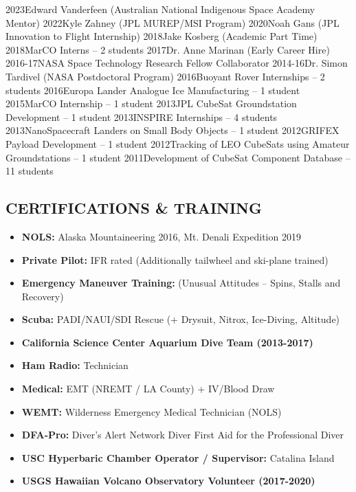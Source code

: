 \documentclass[11pt,letterpaper]{article}
\begin{document}
2023Edward Vanderfeen (Australian National Indigenous Space Academy Mentor)
2022Kyle Zahney (JPL MUREP/MSI Program)
2020Noah Gans (JPL Innovation to Flight Internship)
2018Jake Kosberg (Academic Part Time)
2018MarCO Interns – 2 students
2017Dr. Anne Marinan (Early Career Hire)
2016-17NASA Space Technology Research Fellow Collaborator
2014-16Dr. Simon Tardivel (NASA Postdoctoral Program)
2016Buoyant Rover Internships – 2 students
2016Europa Lander Analogue Ice Manufacturing – 1 student
2015MarCO Internship – 1 student
2013JPL CubeSat Groundstation Development – 1 student
2013INSPIRE Internships – 4 students
2013NanoSpacecraft Landers on Small Body Objects – 1 student
2012GRIFEX Payload Development – 1 student
2012Tracking of LEO CubeSats using Amateur Groundstations – 1 student
2011Development of CubeSat Component Database – 11 students


\subsection*{CERTIFICATIONS \& TRAINING}
\begin{itemize}
\item \textbf{NOLS:} Alaska Mountaineering 2016, Mt. Denali Expedition 2019
\item \textbf{Private Pilot:} IFR rated (Additionally tailwheel and ski-plane trained)
\item \textbf{Emergency Maneuver Training:} (Unusual Attitudes – Spins, Stalls and Recovery)
\item \textbf{Scuba:} PADI/NAUI/SDI Rescue (+ Drysuit, Nitrox, Ice-Diving, Altitude)
\item \textbf{California Science Center Aquarium Dive Team (2013-2017)}
\item \textbf{Ham Radio:} Technician
\item \textbf{Medical:} EMT (NREMT / LA County) + IV/Blood Draw
\item \textbf{WEMT:} Wilderness Emergency Medical Technician (NOLS)
\item \textbf{DFA-Pro:} Diver’s Alert Network Diver First Aid for the Professional Diver
\item \textbf{USC Hyperbaric Chamber Operator / Supervisor:} Catalina Island
\item \textbf{USGS Hawaiian Volcano Observatory Volunteer (2017-2020)}
\end{itemize}
\end{document}
